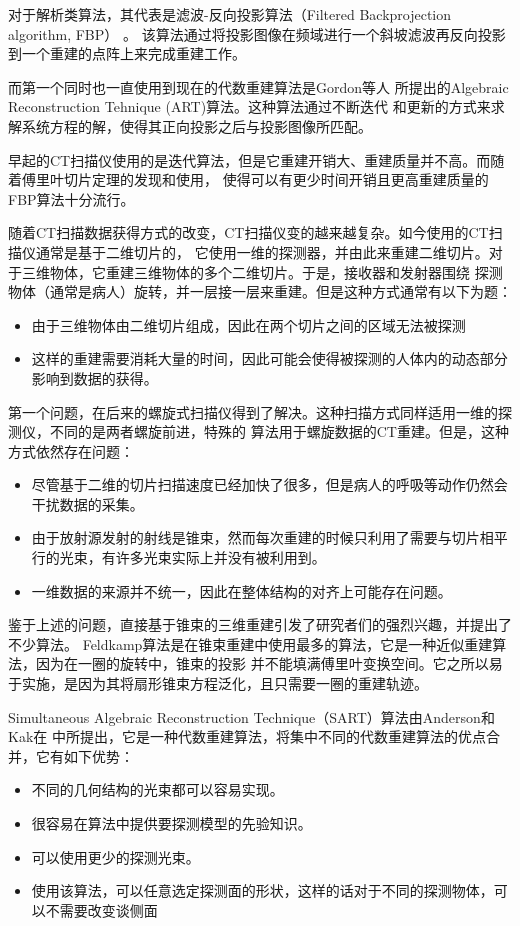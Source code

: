 对于解析类算法，其代表是滤波-反向投影算法（Filtered Backprojection algorithm, FBP）
\cite{bracewell1967inversion}\cite{ramachandran1971three}。
该算法通过将投影图像在频域进行一个斜坡滤波再反向投影
到一个重建的点阵上来完成重建工作。

而第一个同时也一直使用到现在的代数重建算法是Gordon等人\cite{gordon1970algebraic}
所提出的Algebraic Reconstruction Tehnique (ART)算法。这种算法通过不断迭代
和更新的方式来求解系统方程的解，使得其正向投影之后与投影图像所匹配。

早起的CT扫描仪使用的是迭代算法，但是它重建开销大、重建质量并不高。而随着傅里叶切片定理的发现和使用，
使得可以有更少时间开销且更高重建质量的FBP算法十分流行。

随着CT扫描数据获得方式的改变，CT扫描仪变的越来越复杂。如今使用的CT扫描仪通常是基于二维切片的，
它使用一维的探测器，并由此来重建二维切片。对于三维物体，它重建三维物体的多个二维切片。于是，接收器和发射器围绕
探测物体（通常是病人）旋转，并一层接一层来重建。但是这种方式通常有以下为题：
\begin{itemize}
\item 由于三维物体由二维切片组成，因此在两个切片之间的区域无法被探测
\item 这样的重建需要消耗大量的时间，因此可能会使得被探测的人体内的动态部分影响到数据的获得。
\end{itemize}
第一个问题，在后来的螺旋式扫描仪得到了解决。这种扫描方式同样适用一维的探测仪，不同的是两者螺旋前进，特殊的
算法用于螺旋数据的CT重建。但是，这种方式依然存在问题：
\begin{itemize}
\item 尽管基于二维的切片扫描速度已经加快了很多，但是病人的呼吸等动作仍然会干扰数据的采集。
\item 由于放射源发射的射线是锥束，然而每次重建的时候只利用了需要与切片相平行的光束，有许多光束实际上并没有被利用到。
\item 一维数据的来源并不统一，因此在整体结构的对齐上可能存在问题。
\end{itemize}

鉴于上述的问题，直接基于锥束的三维重建引发了研究者们的强烈兴趣，并提出了不少算法。
Feldkamp算法\cite{badea2000volume}是在锥束重建中使用最多的算法，它是一种近似重建算法，因为在一圈的旋转中，锥束的投影
并不能填满傅里叶变换空间。它之所以易于实施，是因为其将扇形锥束方程泛化，且只需要一圈的重建轨迹。

Simultaneous Algebraic Reconstruction Technique（SART）算法由Anderson和Kak在\cite{andersen1984simultaneous}
中所提出，它是一种代数重建算法，将集中不同的代数重建算法的优点合并，它有如下优势：
\begin{itemize}
\item 不同的几何结构的光束都可以容易实现。
\item 很容易在算法中提供要探测模型的先验知识。
\item 可以使用更少的探测光束\cite{mueller1998fast}。
\item 使用该算法，可以任意选定探测面的形状，这样的话对于不同的探测物体，可以不需要改变谈侧面
\end{itemize}

